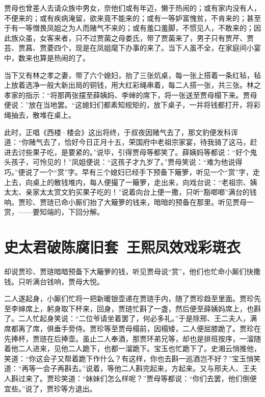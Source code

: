 \documentclass[12pt,oneside]{book}
\begin{document}
贾母也曾差人去请众族中男女，奈他们或有年迈，懒于热闹的；或有家内没有人，不便来的；或有疾病淹留，欲来竟不能来的；或有一等妒富愧贫，不肯来的；甚至于有一等憎畏凤姐之为人而赌气不来的；或有羞口羞脚，不惯见人，不敢来的；因此族众虽，女客来者，只不过贾菌之母娄氏，带了贾菌来了，男子只有贾芹、贾芸、贾菖、贾菱四个，现是在凤姐麾下办事的来了。当下人虽不全，在家庭间小宴中，数来也算是热闹的了。

当下又有林之孝之妻，带了六个媳妇，抬了三张炕桌，每一张上搭着一条红毡，毡上放着选净一般大新出局的铜钱，用大红彩绳串着，每二人搭一张，共三张。林之孝家的指示：“将那两张摆至薛姨妈、李婶的席下，将一张送至贾母榻下来。贾母便说：”放在当地罢。“这媳妇们都素知规矩的，放下桌子，一并将钱都打开，将彩绳抽去，散堆在桌上。

此时，正唱《西楼·楼会》这出将终，于叔夜因赌气去了，那文豹便发科诨道：“你赌气去了，恰好今日正月十五，荣国府中老祖宗家宴，待我骑了这马，赶进去讨些果子吃，是要紧的。”说毕，引得贾母等都笑了。薛姨妈等都说：“好个鬼头孩子，可怜见的！”凤姐便说：“这孩子才九岁了。”贾母笑说：“难为他说得巧。”便说了一个“赏”字。早有三个媳妇已经手下预备下簸箩，听见一个“赏”字，走上去，向桌上的散钱堆内，每人便撮了一簸箩，走出来，向戏台说：“老祖宗、姨太太、亲家太太赏文豹买果子吃的！”说着向台上便一撒，只听“豁啷啷”满台的钱响。贾珍、贾琏已命小厮们抬了大簸箩的钱来，暗暗的预备在那里。听见贾母一赏，——要知端的，下回分解。
 
 
\chapter{史太君破陈腐旧套~王熙凤效戏彩斑衣}
却说贾珍、贾琏暗暗预备下大簸箩的钱，听见贾母说“赏”，他们也忙命小厮们快撒钱。只听满台钱响，贾母大悦。

二人遂起身，小厮们忙将一把新暖银壶递在贾琏手内，随了贾珍趋至里面。贾珍先至李婶席上，躬身取下杯来，回身，贾琏忙斟了一盏，然后便至薛姨妈席上，也斟了。二人忙起身笑说：“二位爷请坐着罢了，何必多礼。”于是除邢、王二夫人，满席都离了席，俱垂手旁侍。贾珍等至贾母榻前，因榻矮，二人便屈膝跪了。贾珍在先捧杯，贾琏在后捧壶。虽止二人奉酒，那贾环弟兄等，却也是排班按序，一溜随着他二人进来，见他二人跪下，也都一溜跪下。宝玉也忙跪下了。史湘云悄推他，笑道：“你这会子又帮着跪下作什么？有这样，你也去斟一巡酒岂不好？”宝玉悄笑道：“再等一会子再斟去。”说着，等他二人斟完起来，方起来。又与邢夫人、王夫人斟过来了。贾珍笑道：“妹妹们怎么样呢？”贾母等都说：“你们去罢，他们倒便宜些。”说了，贾珍等方退出。
\end{document}
